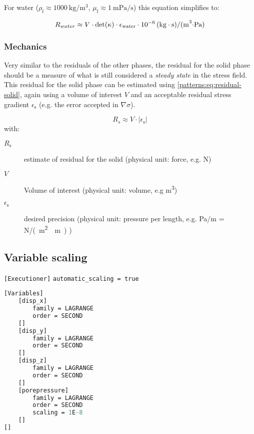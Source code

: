 \vspace{1em}

For water ($\rho_\mathrm{f} \approx \qty[per-mode =
        symbol]{1000}{\kilogram\per\cubic\metre}$, $\mu_\mathrm{f} \approx
    \qty[per-mode = symbol]{1}{\milli\pascal\per\second}$) this equation simplifies
to:

\begin{equation}
    R_{water} \approx V \cdot \det (\kappa) \cdot \epsilon_\mathrm{water} \cdot \SI{E-6}{(\kilogram\cdot\second)\per(\cubic\metre\cdot\pascal)}
\end{equation}

\subsubsection{Mechanics}

Very similar to the residuals of the other phases, the residual for the solid
phase should be a measure of what is still considered a \emph{steady state} in
the stress field. This residual for the solid phase can be estimated using
\autoref{patterns:eq:residual-solid}, again using a volume of interest $V$ and
an acceptable residual stress gradient $\epsilon_\mathrm{s}$ (e.g. the error
accepted in $\nabla \sigma$).

\begin{equation}
    \label{patterns:eq:residual-solid}
    R_{s} \approx V \cdot \left|\epsilon_\mathrm{s}\right|
\end{equation}
with:
\begin{description}
    \item[$R_\mathrm{s}$] estimate of residual for the solid (physical unit: force, e.g. \unit{\newton})
    \item[$V$] Volume of interest (physical unit: volume, e.g \unit{\cubic\metre})
    \item[$\epsilon_\mathrm{s}$] desired precision (physical unit: pressure per length, e.g. \unit[per-mode = symbol]{\pascal\per\metre} = \unit[per-mode = symbol]{\newton\per(\square\metre\cdot\metre)} )
\end{description}

\subsection{Variable scaling}

\texttt{[Executioner]} \texttt{automatic\_scaling = true}

\begin{lstlisting}[language=perl, caption={Variable definition with scaling on porepressure in a Moose inut file},label={patterns-variable-scaling-code}]
[Variables]
    [disp_x]
        family = LAGRANGE
        order = SECOND
    []
    [disp_y]
        family = LAGRANGE
        order = SECOND
    []
    [disp_z]
        family = LAGRANGE
        order = SECOND
    []
    [porepressure]
        family = LAGRANGE
        order = SECOND
        scaling = 1E-8
    []
[]
\end{lstlisting}

